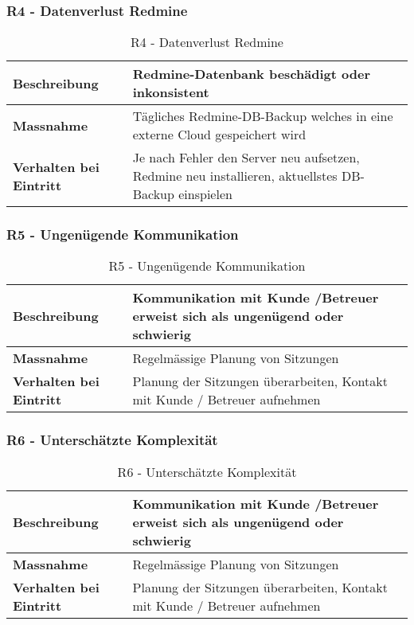 \subsubsection{R4 - Datenverlust Redmine}
\begin{table}[H]
    \centering
    \def\arraystretch{2}
    \begin{tabular}{| p{4.5cm} | p{11.5cm} |} \hline
        \textbf{Beschreibung} & Redmine-Datenbank beschädigt oder inkonsistent\\ \hline
        \textbf{Massnahme} & Tägliches Redmine-DB-Backup welches in eine externe Cloud gespeichert wird\\ \hline
        \textbf{Verhalten bei Eintritt} & Je nach Fehler den Server neu aufsetzen, Redmine neu installieren, aktuellstes DB-Backup einspielen\\ \hline 
    \end{tabular}
    \caption{R4 - Datenverlust Redmine}
\end{table}

\subsubsection{R5 - Ungenügende Kommunikation}
\begin{table}[H]
    \centering
    \def\arraystretch{2}
    \begin{tabular}{| p{4.5cm} | p{11.5cm} |} \hline
        \textbf{Beschreibung} & Kommunikation mit Kunde /Betreuer erweist sich als ungenügend oder schwierig \\ \hline
        \textbf{Massnahme} & Regelmässige Planung von Sitzungen\\ \hline
        \textbf{Verhalten bei Eintritt} & Planung der Sitzungen überarbeiten, Kontakt mit Kunde / Betreuer aufnehmen \\ \hline 
    \end{tabular}
    \caption{R5 - Ungenügende Kommunikation}
\end{table}

\subsubsection{R6 - Unterschätzte Komplexität}
\begin{table}[H]
    \centering
    \def\arraystretch{2}
    \begin{tabular}{| p{4.5cm} | p{11.5cm} |} \hline
        \textbf{Beschreibung} & Kommunikation mit Kunde /Betreuer erweist sich als ungenügend oder schwierig \\ \hline
        \textbf{Massnahme} & Regelmässige Planung von Sitzungen\\ \hline
        \textbf{Verhalten bei Eintritt} & Planung der Sitzungen überarbeiten, Kontakt mit Kunde / Betreuer aufnehmen \\ \hline 
    \end{tabular}
    \caption{R6 - Unterschätzte Komplexität}
\end{table}

